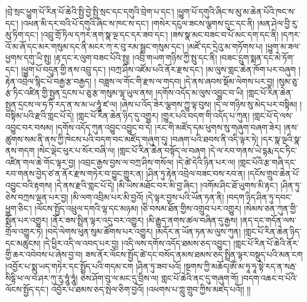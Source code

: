 །བྲེ་སྲང་ཕྱུག་པོ་རིན་པོ་ཆེའི་སྤྱི་བྱེ་སྤྱི་སྲང་དང་དགུའི་བྲེག་པ་དང་། །ཕྱུག་པོ་དགུའི་ཞིང་ས་མུ་མ་ཆེན་པོའི་ཁང་ས་དང་། །འཕན་མི་དར་བའི་པོ་དགུའི་ཞིང་ས་ཁང་ས་དང་། །གསེར་དངུལ་ཟངས་ལྕགས་དུང་དང་ནི། །མན་ཤེལ་བྱི་རུ་མུ་ཏིག་དང་། །འབྲུ་གྲོ་ཏིལ་དཀར་ནག་སྣ་ལྔ་དང་དར་ཟབ་དང་། །ཟས་སྣ་མང་བཟང་བ་པོ་མང་དག་དང་ནི། །དཀར་འོ་མ་ཞོ་དང་མར་གསུམ་དང་ནི་མངར་ཀ་ར་བུ་རམ་སྦྲང་གསུམ་དང་། །མཛོ་དང་དྲེའུ་མ་གཏོགས་པ། །ཕྱུག་མ་ཟལ་ཕྱགས་དགུ་ཡི་སྤུ། །རྟ་དང་ར་ལུག་བཟང་པོའི་སྤུ། །འབྲི་གཡག་གཉིས་ཀྱི་སྤུ་དང་ནི། །བཟང་དྲུག་སྨན་དང་མེ་ཏོག་དང་། །ཕྱུག་པོ་བདུན་གྱི་ནས་འབྲུ་དང་། །བཀྲ་ཤིས་འཛོམ་པའི་ནོར་རྫས་དང་། །མ་ལུས་གླང་ཆེན་ཁོག་པར་བཞུག །རྟེན་འབྲེལ་སྙིང་པོ་བརྒྱ་རྩ་བརྒྱད། །
བཟླས་ལ་གོང་གི་རྫས་ལ་གདབ། །དེ་ནས་ཞབས་སྡོམ་ལེགས་པར་བྱ། །སུམ་ཅུ་རྩ་ཏིང་འཛིན་གྱི་སྤྱན་དྲངས་པ་ཅུ་རྩ་གསུམ་ལྷ་ཡུལ་ནས། །དགོས་འདོད་མ་ལུས་འབྱུང་བ་ཡི། །གླང་པོ་རིན་ཆེན་སྤྱན་དྲངས་ལ་ཧ་ཏི་རད་ན་ས་མ་ཡ་ཧཱུཾ་ཛ་ལ། །ཞེས་པ་འོད་ཟེར་ལྕགས་ཀྱུ་ལྟ་བུས། །དེ་ལ་གཉིས་སུ་མེད་པར་བསྟིམ། །བསྟིམ་པའི་རྫའི་གླང་པོ་དེ། །གླང་པོ་རིན་ཆེན་ཉིད་དུ་འགྱུར། །གྱུར་པའི་བདག་གི་འདོད་པ་ཀུན། །གླང་པོ་དེ་ལས་འབྱུང་བར་བསམ། །དགོས་འདོད་ཀུན་འབྱུང་འབྱུང་བ་དེ། །རང་གི་མཛོད་དམ་ཕུགས་སུ་གཞུག་བཞག་ཟེར། །ནས་ཚུགས་སམ་ནི་ནས་ཀྱི་ཁེངས་པའི་བདག་བང་མཛོད་གཞུག་དུ། །བཞག་པའི་ཐབས་ནི་འདི་ལྟར་ཏེ། །དར་སྣ་ལྔའི་སྣ་ནས་གདག །སེང་ལྡེང་ཕུར་པ་སོར་བཞི་ལ། །གླང་པོ་རིན་ཆེན་བསྟོད་ལ་བཞག །དེ་ལ་རབ་གནས་ཡེ་དྷརྨ་དང་ཏིང་འཛིན་གལ་ཆེ་གོང་ལྟར་བྱ། །འབྲང་རྒྱས་བྱས་ལ་བཀྲ་ཤིས་གསོལ། །དེ་ཚེ་དེའི་ཉིན་པར་ལ། །གླང་པོའི་རྩ་གཞི་དང་རབ་གནས་བྱེད་ཙ་ན་ནོར་རྫས་གཏེར་བ་བྱུང་གྱུར་ན། །ཤིན་ཏུ་རྟེན་འབྲེལ་བཟང་བས་རབ་ན། །དངོས་གྲུབ་ཆེན་པོ་འབྱུང་བའི་རྟགས། །དེ་ནས་རྫའི་གླང་པོ་དེ། །མི་ཡིས་མཐོང་བར་མི་བྱ་ཞིང་། །འགོམ་ཤིང་ཐོ་ཡུགས་མི་རྟང་། །ཤིན་ཏུ་ཅེས་བཀྲས་ལྡན་པར་བྱ། །མི་ལག་འབྲིམ་པར་མི་བྱའོ། །དེ་ལྟར་བྱས་པའི་ཡོན་ཏན་ནི། །བདག་ཉིད་ཤིན་ཏུ་དབང་ཕྱུག་ཅིང་། །ལོངས་སྤྱོད་འཕྲུལ་དགའི་ལྷ་དང་མཉམ། །ཅི་བསམ་ཐོན་གྱིས་འགྲུབ་པར་འགྱུར། །སེམས་ཅན་ཀུན་གྱི་སྨོན་པར་འགྱུར། །ནོར་ཟས་སྤྲིན་ལྟར་འདུ་བར་འགྱུར། །མི་རྒྱུད་ནགས་ཚལ་བཞིན་དུ་རྒྱས། །ནད་དང་གདོན་ལས་གྲོལ་འགྱུར་ཏེ། །བདེ་ལེགས་ཕུན་སུམ་ཚོགས་པར་འགྱུར། །མདོར་ན་ཡོན་ཏན་མ་ལུས་ཀུན། །གླང་པོ་རིན་ཆེན་ཉིད་དང་མཚུངས། །དེ་ཕྱིར་འདི་ལ་འབད་པར་བྱ། །འདི་ལས་དགོས་འདོད་ཐམས་ཅད་འབྱུང་། །གླང་པོ་རིན་པོ་ཆེའི་ནོར་གྱི་ཆར་འབེབས་པ་ཞེས་བྱ་བ། ཟས་ནོར་ལོངས་སྤྱོད་ཚེ་དང་བསོད་ནམས་ཐམས་ཅད་སྤྲིན་ལྟར་བསྡུད་པའི་མན་ངག །འབྱོར་པ་སྨུ་ཡད་གཏེར་དང་སྤྲོད་པའི་གདམ་ངག །ཤིན་ཏུ་ཟབ་པའོ། །སྔགས་ཀྱི་མཆོད།ཨོཾ་མ་ཧཱ་ཧཱ་སྟེ་རད་ན་སརྦ་སིདྷི་ཕ་ལ་བ་ཤར་ཀུ་རུ་ཧཱུཾ་ཧཱུཾ། ཅེས་ཤོག་བུ་ལ་མང་དུ་བྲིས་ལ། གླང་པོ་ཆེའི་ནང་དུ་གཞུག་གོ། །བདག་འཆང་བ་པོའི་ལོངས་སྤྱོད་དང་། འབྱོར་པ་ཐམས་ཅད་སྤེལ་ཅིག་བྱའོ། །འཕགས་པ་ཀླུ་གྲུབ་ཀྱིས་མཛད་པའོ།། །།